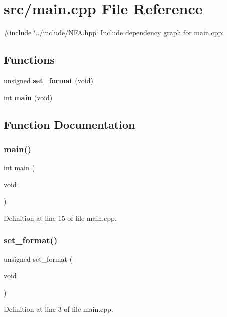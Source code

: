 \section{src/main.cpp File Reference}
\label{main_8cpp}
{\ttfamily \#include \char`\"{}../include/\+N\+F\+A.\+hpp\char`\"{}}\newline
Include dependency graph for main.\+cpp\+:
\subsection*{Functions}
\begin{DoxyCompactItemize}
\item 
unsigned \textbf{ set\+\_\+format} (void)
\item 
int \textbf{ main} (void)
\end{DoxyCompactItemize}


\subsection{Function Documentation}
\mbox{\label{main_8cpp_a840291bc02cba5474a4cb46a9b9566fe}} 
\subsubsection{main()}
{\footnotesize\ttfamily int main (\begin{DoxyParamCaption}\item[{void}]{ }\end{DoxyParamCaption})}



Definition at line 15 of file main.\+cpp.

\mbox{\label{main_8cpp_a00c4799377f66d63295d04e81bf1fa05}} 
\subsubsection{set\+\_\+format()}
{\footnotesize\ttfamily unsigned set\+\_\+format (\begin{DoxyParamCaption}\item[{void}]{ }\end{DoxyParamCaption})}



Definition at line 3 of file main.\+cpp.

